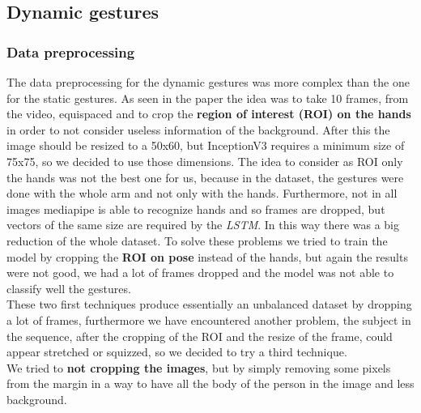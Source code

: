 \documentclass[10pt,twocolumn,letterpaper]{article}
\begin{document}
\subsection{Dynamic gestures}
\subsubsection{Data preprocessing}
\label{subsec:datapreprocessing}
The data preprocessing for the dynamic gestures was more complex than the one for the static gestures. As seen in the paper \cite{electronics13163233} the idea was to take 10 frames, from the video, equispaced and to crop the \textbf{region of interest (ROI) on the hands} in order to not consider useless information of the background.
After this the image should be resized to a 50x60, but InceptionV3 requires a minimum size 
of 75x75, so we decided to use those dimensions.
The idea to consider as ROI only the hands was not the best one for us, because in the dataset, the gestures were done with the whole 
arm and not only with the hands. Furthermore, not in all images mediapipe is able to recognize hands and so frames are dropped, 
but vectors of the same size are required by the \textit{LSTM}. In this way there was a big reduction of the whole dataset.
To solve these problems we tried to train the model by cropping the \textbf{ROI on pose} instead of the hands, but again the results were not good, we had a lot of frames dropped and the model was not able to classify well the gestures. \\ 
These two first techniques produce essentially an unbalanced dataset by dropping a lot of frames, furthermore we have encountered another problem, the subject in the sequence, after the cropping of the ROI and the resize of the frame, could appear stretched or squizzed, so we decided to try a third technique. \\
We tried to \textbf{not cropping the images}, but by simply removing some pixels from the margin in a way to have all the body of the person in the image and less background.
\end{document}
